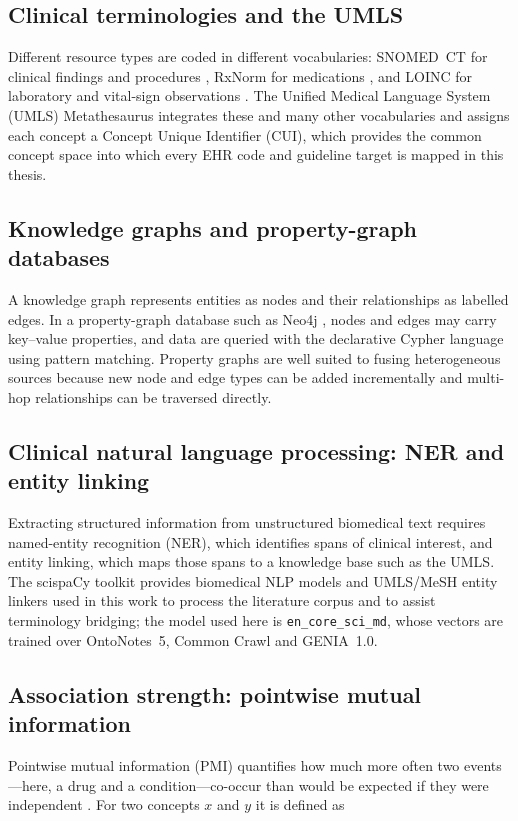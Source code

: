 \subsection{Clinical terminologies and the UMLS}
Different resource types are coded in different vocabularies: SNOMED~CT for clinical findings
and procedures \cite{snomedct}, RxNorm for medications \cite{rxnorm}, and LOINC for
laboratory and vital-sign observations \cite{loinc}. The Unified Medical Language System
(UMLS) Metathesaurus \cite{umls} integrates these and many other vocabularies and assigns
each concept a Concept Unique Identifier (CUI), which provides the common concept space into
which every EHR code and guideline target is mapped in this thesis.

\subsection{Knowledge graphs and property-graph databases}
A knowledge graph represents entities as nodes and their relationships as labelled edges. In
a property-graph database such as Neo4j \cite{neo4j}, nodes and edges may carry key--value
properties, and data are queried with the declarative Cypher language \cite{cypher} using
pattern matching. Property graphs are well suited to fusing heterogeneous sources because new
node and edge types can be added incrementally and multi-hop relationships can be traversed
directly.

\subsection{Clinical natural language processing: NER and entity linking}
Extracting structured information from unstructured biomedical text requires named-entity
recognition (NER), which identifies spans of clinical interest, and entity linking, which
maps those spans to a knowledge base such as the UMLS. The scispaCy toolkit \cite{scispacy}
provides biomedical NLP models and UMLS/MeSH entity linkers used in this work to process the
literature corpus and to assist terminology bridging; the model used here is
\texttt{en\_core\_sci\_md}, whose vectors are trained over OntoNotes~5, Common Crawl and
GENIA~1.0.

\subsection{Association strength: pointwise mutual information}
Pointwise mutual information (PMI) quantifies how much more often two events---here, a drug
and a condition---co-occur than would be expected if they were independent \cite{pmi}.
For two concepts $x$ and $y$ it is defined as

